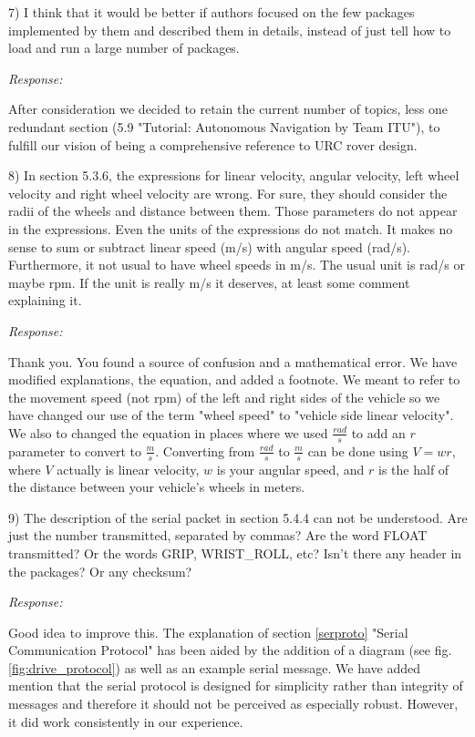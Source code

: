 \documentclass[runningheads,a4paper]{llncs}
\newcommand{\rsp}{\noindent \textit{Response:}}
\begin{document}
7)  I think that it would be better if authors focused on the few packages implemented by them and described them in details, instead of just tell how to load and run a large number of packages.

\rsp

After consideration we decided to retain the current number of topics, less one redundant section (5.9 "Tutorial: Autonomous Navigation by Team ITU"), to fulfill our vision of being a comprehensive reference to URC rover design.

8)  In section 5.3.6, the expressions for linear velocity, angular velocity, left wheel velocity and right wheel velocity are wrong. For sure, they should consider the radii of the wheels and distance between them. Those parameters do not appear in the expressions. Even the units of the expressions do not match. It makes no sense to sum or subtract linear speed (m/s) with angular speed (rad/s). Furthermore, it not usual to have wheel speeds in m/s. The usual unit is rad/s or maybe rpm. If the unit is really m/s it deserves, at least some comment explaining it.

\rsp

Thank you. You found a source of confusion and a mathematical error. We have modified explanations, the equation, and added a footnote. We meant to refer to the movement speed (not rpm) of the left and right sides of the vehicle so we have changed our use of the term "wheel speed" to "vehicle side linear velocity". We also to changed the equation in places where we used \(\frac{rad}{s}\) to add an \(r\) parameter to convert to \(\frac{m}{s}\). Converting from \(\frac{rad}{s}\) to \(\frac{m}{s}\) can be done using \(V=wr\), where \(V\) actually is linear velocity,  \(w\) is your angular speed, and \(r\) is the half of the distance between your vehicle's wheels in meters. 

9)  The description of the serial packet in section 5.4.4 can not be understood. Are just the number transmitted, separated by commas? Are the word FLOAT transmitted? Or the words GRIP, WRIST\_ROLL, etc? Isn't there any header in the packages? Or any checksum?

\rsp

Good idea to improve this. The explanation of section \ref{serproto} "Serial Communication Protocol" has been aided by the addition of a diagram (see fig. \ref{fig:drive_protocol}) as well as an example serial message. We have added mention that the serial protocol is designed for simplicity rather than integrity of messages and therefore it should not be perceived as especially robust. However, it did work consistently in our experience.
\end{document}
